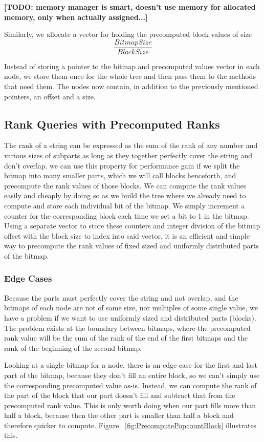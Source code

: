 \textbf{[TODO: memory manager is smart, doesn't use memory for allocated memory, only when actually assigned...]}

Similarly, we allocate a vector for holding the precomputed block values of size
\[ \frac{BitmapSize}{BlockSize} \]

Instead of storing a pointer to the bitmap and precomputed values vector in each node, we store them once for the whole tree and then pass them to the methods that need them.
The nodes now contain, in addition to the previously mentioned pointers, an offset and a size.


\subsection{Rank Queries with Precomputed Ranks}
The rank of a string can be expressed as the sum of the rank of any number and various sizes of subparts as long as they together perfectly cover the string and don't overlap.
we can use this property for performance gain if we split the bitmap into many smaller parts, which we will call blocks henceforth, and precompute the rank values of those blocks.
We can compute the rank values easily and cheaply by doing so as we build the tree where we already need to compute and store each individual bit of the bitmap.
We simply increment a counter for the corresponding block each time we set a bit to 1 in the bitmap.
Using a separate vector to store these counters and integer division of the bitmap offset with the block size to index into said vector, it is an efficient and simple way to precompute the rank values of fixed sized and uniformly distributed parts of the bitmap.


\subsubsection{Edge Cases}
\label{sec:rankQueriesWithPrecomputedRanksEdgeCases}
Because the parts must perfectly cover the string and not overlap, and the bitmaps of each node are not of same size, nor multiples of some single value, we have a problem if we want to use uniformly sized and distributed parts (blocks).
The problem exists at the boundary between bitmaps, where the precomputed rank value will be the sum of the rank of the end of the first bitmaps and the rank of the beginning of the second bitmap.

Looking at a single bitmap for a node, there is an edge case for the first and last part of the bitmap, because they don't fill an entire block, so we can't simply use the corresponding precomputed value as-is.
Instead, we can compute the rank of the part of the block that our part doesn't fill and subtract that from the precomputed rank value.
This is only worth doing when our part fills more than half a block, because then the other part is smaller than half a block and therefore quicker to compute.
Figure ~\ref{fig:PrecomputePopcountBlock} illustrates this.

